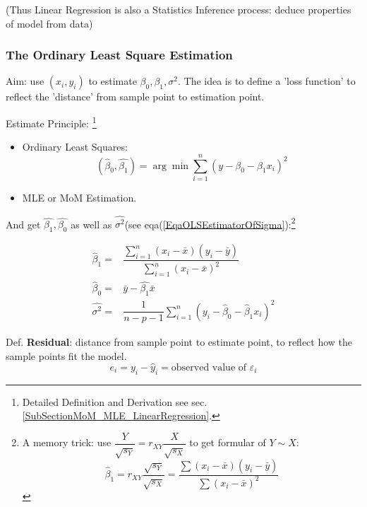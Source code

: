     
    (Thus Linear Regression is also a Statistics Inference process: deduce properties of model from data)
        
\subsubsection{The Ordinary Least Square Estimation}
    Aim: use $ (x_i,y_i) $  to estimate $ \beta _0,\beta _1,\sigma^2 $. The idea is to define a 'loss function' to reflect the 'distance' from sample point to estimation point.

    Estimate Principle: \footnote{Detailed Definition and Derivation see sec.\ref{SubSectionMoM_MLE_LinearRegression}.}
    \begin{itemize}[topsep=2pt,itemsep=2pt]
        \item Ordinary Least Squares:
        \[
            (\hat{\beta  }_0,\hat{\beta _1})=\arg\min\sum_{i=1}^n (y-\beta _0-\beta _1x_i)^2
        \]
        \item MLE or MoM Estimation.
    \end{itemize}
    

    
    And get $ \hat{\beta _1},\hat{\beta _0}$ as well as $ \hat{\sigma^2} $(see eqa(\ref{EqaOLSEstimatorOfSigma}):\footnote{A memory trick: use $ \dfrac{Y}{\sqrt{s_Y}}=r_{XY}\dfrac{X}{\sqrt{s_X}} $ to get formular of $ Y\sim X $:
    \[
        \hat{\beta }_1=r_{XY}\dfrac{\sqrt{s_Y}}{\sqrt{s_X}}=\dfrac{{\displaystyle\sum (x_i-\bar{x})(y_i-\bar{y})}}{{\displaystyle\sum (x_i-\bar{x})^2}} 
    \]}

\begin{equation}\label{EqaOLSEstimatorOfBeta}
    \begin{aligned}
        \hat{\beta }_1=&\dfrac{\sum\limits_{i=1}^n (x_i-\bar{x})(y_i-\bar{y})}{\sum\limits_{i=1}^n (x_i-\bar{x})^2}\\
        \hat{\beta }_0=&\bar{y}-\hat{\beta _1}\bar{x}\\
        \hat{\sigma^2}=&\dfrac{1}{n-p-1}\sum_{i=1}^n(y_i-\hat{\beta }_0-\hat{\beta }_1x_i)^2
    \end{aligned}
\end{equation}


    
    Def. \textbf{Residual}: distance from sample point to estimate point, to reflect how the sample points fit the model.
    \[
        e_i=y_i-\hat{y}_i=\text{observed value of }\varepsilon _i 
    \]
    

